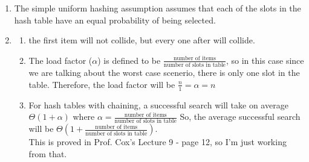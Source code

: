 \documentclass[9pt]{article}
\newcommand{\lp}{\left(}
\newcommand{\rp}{\right)}
\newcommand{\ben}{\begin{enumerate}}
\newcommand{\een}{\end{enumerate}}
\begin{document}
\ben 
	\item 
		The simple uniform hashing assumption assumes that each of the slots in the hash table have an equal probability of being selected.
	\item
	\ben 
		\item {} the first item will not collide, but every one after will collide.
		\item The load factor ($\alpha$) is defined to be $\frac{\text{number of items}}{\text{number of slots in table}}$, so in this case since we are talking about the worst case scenerio, there is only one slot in the table. Therefore, the load factor will be $\frac{n}{1} = \alpha = n$
		\item For hash tables with chaining, a successful search will take on average $\Theta (1+ \alpha)$ where $\alpha = \frac{\text{number of items}}{\text{number of slots in table}}$ So, the average successful search will be $\Theta \lp 1 + \frac{\text{number of items}}{\text{number of slots in table}} \rp$.\\
			This is proved in Prof. Cox's Lecture 9 - page 12, so I'm just working from that.
	\een 
\een


\fi
\newpage



\vspace{5mm}
\end{document}
